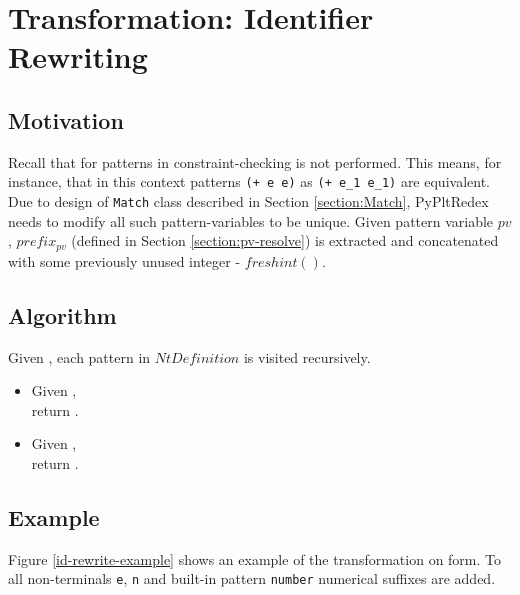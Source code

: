 \section{Transformation: Identifier Rewriting}
\label{section:id-rewrite}

\subsection{Motivation}

Recall that for patterns in \DefineLanguageNoArg constraint-checking is not performed. This means, for instance, that in this context patterns \texttt{(+ e e)} as \texttt{(+ e\_1 e\_1)} are equivalent. Due to design of \texttt{Match} class described in Section \ref{section:Match}, PyPltRedex needs to modify all such pattern-variables to be unique. Given pattern variable $pv$, $prefix_{pv}$ (defined in Section \ref{section:pv-resolve}) is extracted and concatenated with some previously unused integer - $freshint()$. 

\subsection{Algorithm}
Given , each pattern in $NtDefinition$ is visited recursively.
\begin{itemize}
\item Given \BuiltInPattern, \\ return .
\item Given \NonTerminal, \\ return .
\end{itemize}

\subsection{Example}

Figure \ref{id-rewrite-example} shows an example of the transformation on \DefineLanguage form. To all non-terminals \texttt{e}, \texttt{n} and built-in pattern \texttt{number} numerical suffixes are added.

